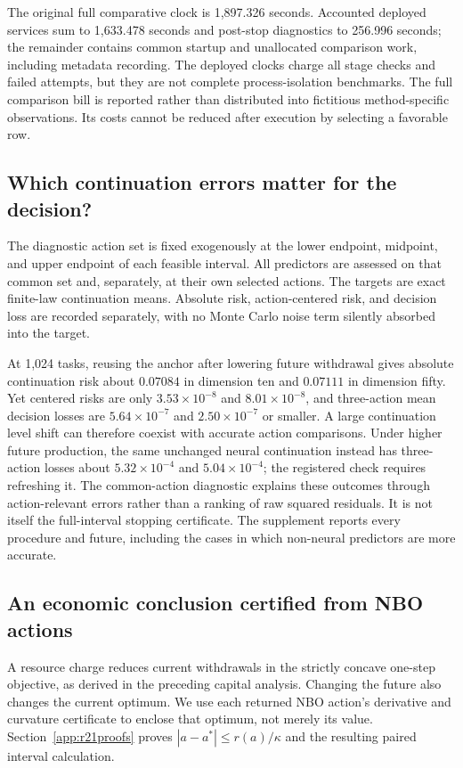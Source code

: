 The original full comparative clock is 1,897.326 seconds. Accounted deployed
services sum to 1,633.478 seconds and post-stop diagnostics to 256.996 seconds;
the remainder contains common startup and unallocated comparison work,
including metadata recording. The deployed clocks charge all stage checks
and failed attempts, but they are not complete process-isolation benchmarks.
The full comparison bill is reported rather than distributed into fictitious
method-specific observations. Its costs cannot be reduced after execution
by selecting a favorable row.

\subsection{Which continuation errors matter for the decision?}
The diagnostic action set is fixed exogenously at the lower endpoint,
midpoint, and upper endpoint of each feasible interval. All predictors are
assessed on that common set and, separately, at their own selected actions.
The targets are exact finite-law continuation means. Absolute risk,
action-centered risk, and decision loss are recorded separately, with no
Monte Carlo noise term silently absorbed into the target.

At 1,024 tasks, reusing the anchor after lowering future withdrawal gives
absolute continuation risk about $0.07084$ in dimension ten and $0.07111$
in dimension fifty. Yet centered risks are only $3.53\times10^{-8}$ and
$8.01\times10^{-8}$, and three-action mean decision losses are
$5.64\times10^{-7}$ and $2.50\times10^{-7}$ or smaller. A large continuation
level shift can therefore coexist with accurate action comparisons. Under
higher future production, the same unchanged neural continuation instead
has three-action losses about $5.32\times10^{-4}$ and $5.04\times10^{-4}$;
the registered check requires refreshing it. The common-action diagnostic
explains these outcomes through action-relevant errors rather than a ranking
of raw squared residuals. It is not itself the full-interval stopping
certificate. The supplement reports every procedure and future, including
the cases in which non-neural predictors are more accurate.

\subsection{An economic conclusion certified from NBO actions}
A resource charge reduces current withdrawals in the strictly concave
one-step objective, as derived in the preceding capital analysis. Changing
the future also changes the current optimum. We use each returned NBO
action's derivative and curvature certificate to enclose that optimum,
not merely its value. Section~\ref{app:r21proofs} proves
$|a-a^*|\leq r(a)/\kappa$ and the resulting paired interval calculation.

